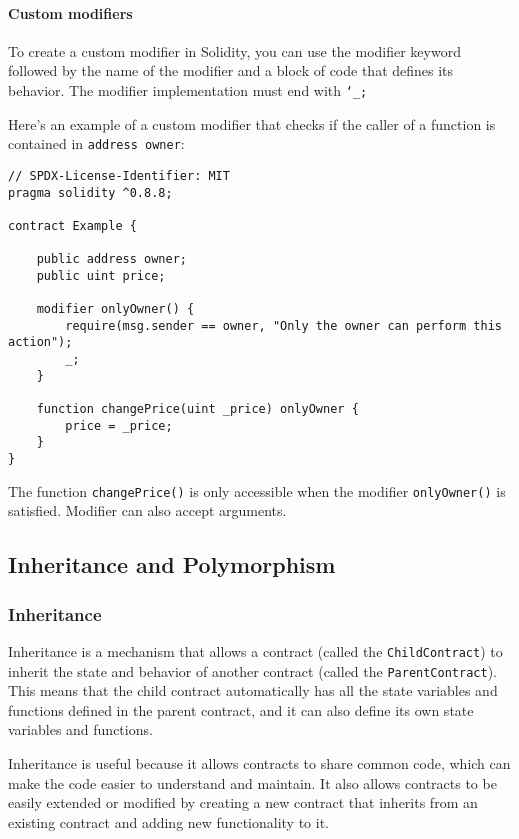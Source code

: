 \documentclass{article}
\theoremstyle{theorem}
\theoremstyle{definition}
\theoremstyle{remark}
\begin{document}
\paragraph{Custom modifiers}
To create a custom modifier in Solidity, you can use the modifier keyword followed by the name of the modifier and a block of code that defines its behavior. The modifier implementation must end with \colorbox{Gainsboro!60!Lavender}{\texttt{\char`_;}}

\medskip\noindent
Here's an example of a custom modifier that checks if the caller of a function is contained in \texttt{address owner}:

\begin{itemize}
\begin{lstlisting}
// SPDX-License-Identifier: MIT
pragma solidity ^0.8.8;

contract Example {

    public address owner;
    public uint price;

    modifier onlyOwner() {
        require(msg.sender == owner, "Only the owner can perform this action");
        _;
    }
    
    function changePrice(uint _price) onlyOwner {
        price = _price;
    }
}
\end{lstlisting}
\end{itemize}

\medskip\noindent
The function \texttt{changePrice()} is only accessible when the modifier \texttt{onlyOwner()} is satisfied. Modifier can also accept arguments.


\subsection{Inheritance and Polymorphism} \label{poly-inheritance}

\subsubsection{Inheritance} \label{inheritance}
Inheritance is a mechanism that allows a contract (called the \texttt{ChildContract}) to inherit the state and behavior of another contract (called the \texttt{ParentContract}). This means that the child contract automatically has all the state variables and functions defined in the parent contract, and it can also define its own state variables and functions.

\medskip\noindent
Inheritance is useful because it allows contracts to share common code, which can make the code easier to understand and maintain. It also allows contracts to be easily extended or modified by creating a new contract that inherits from an existing contract and adding new functionality to it.
\end{document}
